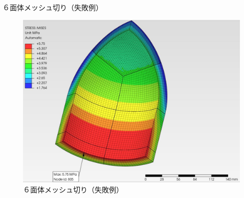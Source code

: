 \begin{frame}{６面体メッシュ切り（失敗例）}
 
\begin{figure}[htbp]
\begin{center}
\includegraphics[keepaspectratio,scale=1.0]{work/images/fig03.jpg}
\caption{６面体メッシュ切り（失敗例）}
\end{center}
\end{figure}
 
\end{frame}
